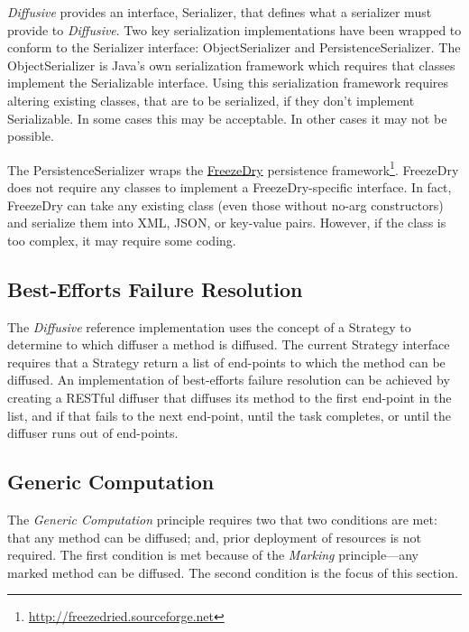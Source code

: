 \documentclass[11pt]{article}
\begin{document}
\emph{Diffusive} provides an interface, \textsf{Serializer}, that defines what a serializer must provide to \emph{Diffusive}. Two key serialization implementations have been wrapped to conform to the \textsf{Serializer} interface: \textsf{ObjectSerializer} and \textsf{PersistenceSerializer}. The \textsf{ObjectSerializer} is Java's own serialization framework which requires that classes implement the \textsf{Serializable} interface. Using this serialization framework requires altering existing classes, that are to be serialized, if they don't implement \textsf{Serializable}. In some cases this may be acceptable. In other cases it may not be possible.

The \textsf{PersistenceSerializer} wraps the \href{http://freezedried.sourceforge.net}{FreezeDry} persistence framework\footnote{\url{http://freezedried.sourceforge.net}}. FreezeDry does not require any classes to implement a FreezeDry-specific interface. In fact, FreezeDry can take any existing class (even those without no-arg constructors) and serialize them into XML, JSON, or key-value pairs. However, if the class is too complex, it may require some coding.

\subsection{Best-Efforts Failure Resolution\label{sec:best_efforts_failure_resolution_ref_impl}}
The \emph{Diffusive} reference implementation uses the concept of a \textsf{Strategy} to determine to which diffuser a method is diffused. The current \textsf{Strategy} interface requires that a \textsf{Strategy} return a list of end-points to which the method can be diffused. An implementation of best-efforts failure resolution can be achieved by creating a RESTful diffuser that diffuses its method to the first end-point in the list, and if that fails to the next end-point, until the task completes, or until the diffuser runs out of end-points.

\subsection{Generic Computation\label{sec:generic_computation}}
The \emph{Generic Computation} principle requires two that two conditions are met: that any method can be diffused; and, prior deployment of resources is not required. The first condition is met because of the \emph{Marking} principle---any marked method can be diffused. The second condition is the focus of this section.
\end{document}
